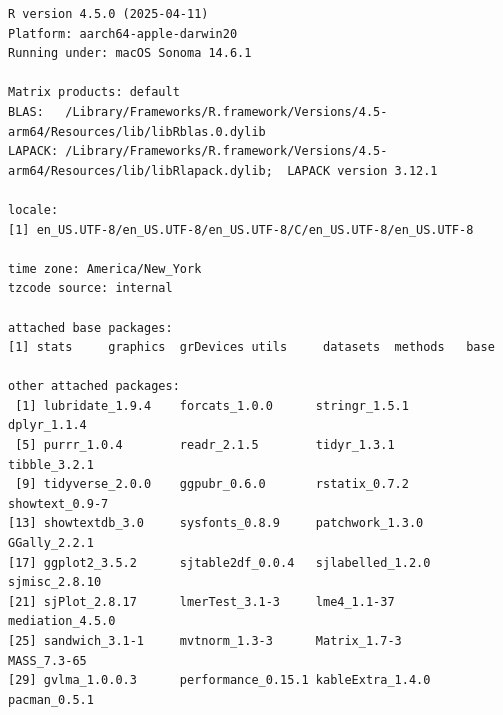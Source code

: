 \documentclass[
  letterpaper,
  DIV=11,
  numbers=noendperiod]{scrreprt}
\begin{document}
\begin{verbatim}
R version 4.5.0 (2025-04-11)
Platform: aarch64-apple-darwin20
Running under: macOS Sonoma 14.6.1

Matrix products: default
BLAS:   /Library/Frameworks/R.framework/Versions/4.5-arm64/Resources/lib/libRblas.0.dylib 
LAPACK: /Library/Frameworks/R.framework/Versions/4.5-arm64/Resources/lib/libRlapack.dylib;  LAPACK version 3.12.1

locale:
[1] en_US.UTF-8/en_US.UTF-8/en_US.UTF-8/C/en_US.UTF-8/en_US.UTF-8

time zone: America/New_York
tzcode source: internal

attached base packages:
[1] stats     graphics  grDevices utils     datasets  methods   base     

other attached packages:
 [1] lubridate_1.9.4    forcats_1.0.0      stringr_1.5.1      dplyr_1.1.4       
 [5] purrr_1.0.4        readr_2.1.5        tidyr_1.3.1        tibble_3.2.1      
 [9] tidyverse_2.0.0    ggpubr_0.6.0       rstatix_0.7.2      showtext_0.9-7    
[13] showtextdb_3.0     sysfonts_0.8.9     patchwork_1.3.0    GGally_2.2.1      
[17] ggplot2_3.5.2      sjtable2df_0.0.4   sjlabelled_1.2.0   sjmisc_2.8.10     
[21] sjPlot_2.8.17      lmerTest_3.1-3     lme4_1.1-37        mediation_4.5.0   
[25] sandwich_3.1-1     mvtnorm_1.3-3      Matrix_1.7-3       MASS_7.3-65       
[29] gvlma_1.0.0.3      performance_0.15.1 kableExtra_1.4.0   pacman_0.5.1      


\end{verbatim}
\end{document}
